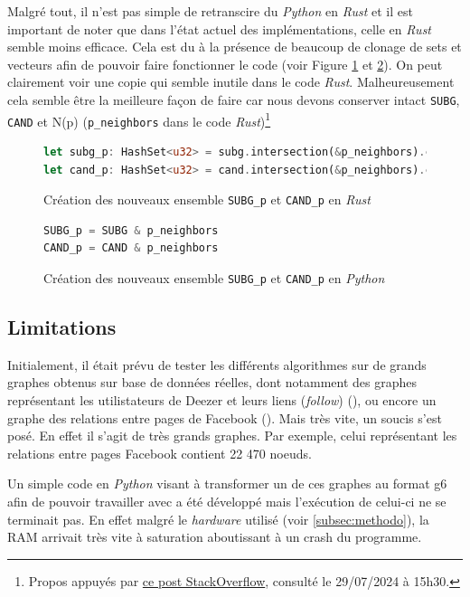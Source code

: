 \documentclass[12pt,a4paper]{article}
\begin{document}
Malgré tout, il n'est pas simple de retranscire du \emph{Python} en \emph{Rust} et il est important de noter que dans l'état actuel des implémentations, celle en \emph{Rust} semble moins efficace. Cela est du à la présence de beaucoup de clonage de sets et vecteurs afin de pouvoir faire fonctionner le code (voir Figure \ref{fig:r2} et \ref{fig:p2}). On peut clairement voir une copie qui semble inutile dans le code \emph{Rust}. Malheureusement cela semble être la meilleure façon de faire car nous devons conserver intact \texttt{SUBG}, \texttt{CAND} et N(p) (\texttt{p\_neighbors} dans le code \emph{Rust})\footnote{Propos appuyés par \href{https://stackoverflow.com/questions/55975234/how-do-i-intersect-two-hashsets-while-moving-values-in-common-into-a-new-set}{ce post StackOverflow}, consulté le 29/07/2024 à 15h30.}
\begin{figure}[ht]
  \begin{lstlisting}[language=Rust]
let subg_p: HashSet<u32> = subg.intersection(&p_neighbors).cloned().collect();
let cand_p: HashSet<u32> = cand.intersection(&p_neighbors).cloned().collect();
  \end{lstlisting}
  \caption{Création des nouveaux ensemble \texttt{SUBG\_p} et \texttt{CAND\_p} en \emph{Rust}}
  \label{fig:r2}
\end{figure}
\begin{figure}[ht]
  \begin{lstlisting}[language=Python]
SUBG_p = SUBG & p_neighbors
CAND_p = CAND & p_neighbors
  \end{lstlisting}
  \caption{Création des nouveaux ensemble \texttt{SUBG\_p} et \texttt{CAND\_p} en \emph{Python}}
  \label{fig:p2}
\end{figure}
\subsection{Limitations}%
\label{subsec:limit}

Initialement, il était prévu de tester les différents algorithmes sur de grands graphes obtenus sur base de données réelles, dont notamment des graphes représentant les utilistateurs de Deezer et leurs liens (\emph{follow}) (\cite{rozemberczki2020characteristic}), ou encore un graphe des relations entre pages de Facebook (\cite{rozemberczki2019multiscale}). Mais très vite, un soucis s'est posé. En effet il s'agit de très grands graphes. Par exemple, celui représentant les relations entre pages Facebook contient 22 470 noeuds.

Un simple code en \emph{Python} visant à transformer un de ces graphes au format g6 afin de pouvoir travailler avec a été développé mais l'exécution de celui-ci ne se terminait pas. En effet malgré le \emph{hardware} utilisé (voir \ref{subsec:methodo}), la RAM arrivait très vite à saturation aboutissant à un crash du programme.
\end{document}
